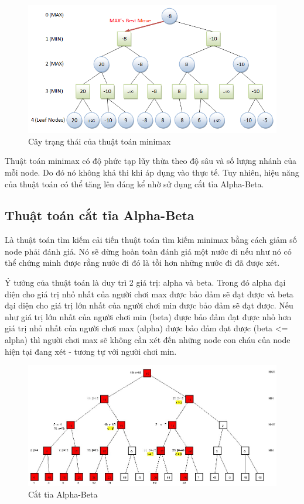 \documentclass[12pt]{report}
\begin{document}
\begin{figure}[H]
\caption{Cây trạng thái của thuật toán minimax}
\includegraphics[width=\textwidth]{minimax.png}
\end{figure}

Thuật toán minimax có độ phức tạp lũy thừa theo độ sâu và số lượng nhánh của mỗi node. Do đó nó không khả thi khi áp dụng vào thực tế. 
Tuy nhiên, hiệu năng của thuật toán có thể tăng lên đáng kể nhờ sử dụng cắt tỉa Alpha-Beta. 

\subsection{Thuật toán cắt tỉa Alpha-Beta}
Là thuật toán tìm kiếm cải tiến thuật toán tìm kiếm minimax bằng cách giảm số node phải đánh giá. 
Nó sẽ dừng hoàn toàn đánh giá một nước đi nếu như nó có thể chứng minh được rằng nước đi đó là tồi hơn những nước đi đã được xét. 

Ý tưởng của thuật toán là duy trì 2 giá trị: alpha và beta.
Trong đó alpha đại diện cho giá trị nhỏ nhất của người chơi max được bảo đảm sẽ đạt được và beta đại diện cho giá trị lớn nhất của người chơi min được bảo đảm sẽ đạt được. 
Nếu như giá trị lớn nhất của người chơi min (beta) được bảo đảm đạt được nhỏ hơn giá trị 
nhỏ nhất của người chơi max (alpha) được bảo đảm đạt được (beta <= alpha) thì người chơi max 
sẽ không cần xét đến những node con cháu của node hiện tại đang xét - tương tự với người chơi min. 

\begin{figure}[H]
\caption{Cắt tỉa Alpha-Beta}
\includegraphics[width=\textwidth]{alpha-beta.jpg}
\end{figure}
\end{document}
